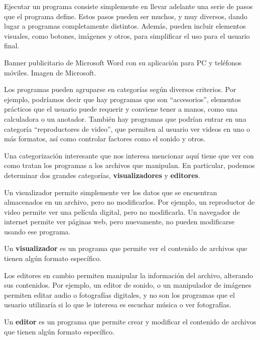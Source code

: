 Ejecutar un programa consiste simplemente en llevar adelante una serie de pasos
que el programa define. Estos pasos pueden ser muchos, y muy diversos, dando
lugar a programas completamente distintos. Además, pueden incluir elementos
visuales, como botones, imágenes y otros, para simplificar el uso para el
usuario final.

{Banner publicitario de Microsoft Word con su aplicación para PC y teléfonos
móviles.} {Imagen de Microsoft.}

Los programas pueden agruparse en categorías según diversos criterios. Por
ejemplo, podríamos decir que hay programas que son ``accesorios'', elementos
prácticos que el usuario puede requerir y conviene tener a manos, como una
calculadora o un anotador. También hay programas que podrían entrar en una
categoría ``reproductores de video'', que permiten al usuario ver videos en uno
o más formatos, así como controlar factores como el sonido y otros.

Una categorización interesante que nos interesa mencionar aquí tiene que ver con
como tratan los programas a los archivos que manipulan. En particular, podemos
determinar dos grandes categorías, \textbf{visualizadores} y \textbf{editores}.

Un visualizador permite simplemente ver los datos que se encuentran almacenados
en un archivo, pero no modificarlos. Por ejemplo, un reproductor de video
permite ver una película digital, pero no modificarla. Un navegador de internet
permite ver páginas web, pero nuevamente, no pueden modificarse usando ese
programa.

\begin{definition} Un \textbf{visualizador} es un programa
    que permite ver el contenido de archivos que tienen algún formato
    específico.
\end{definition}

Los editores en cambio permiten manipular la información del archivo, alterando
sus contenidos. Por ejemplo, un editor de sonido, o un manipulador de imágenes
permiten editar audio o fotografías digitales, y no son los programas que el
usuario utilizaría si lo que le interesa es escuchar música o ver fotografías.

\begin{definition} Un \textbf{editor} es un programa que permite
    crear y modificar el contenido de archivos que tienen algún formato
    específico.
\end{definition}

